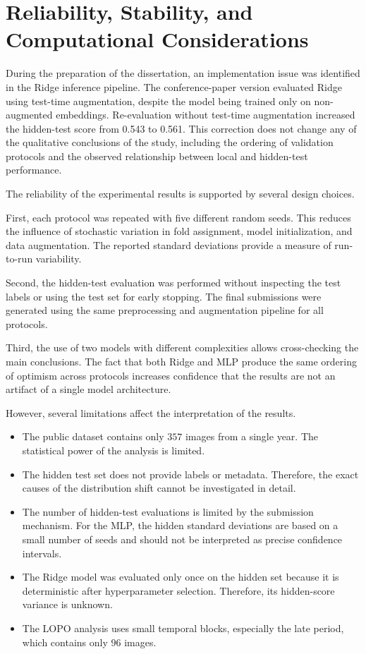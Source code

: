 \section{Reliability, Stability, and Computational Considerations}

During the preparation of the dissertation, an implementation issue was identified in the Ridge inference pipeline. The conference-paper version evaluated Ridge using test-time augmentation, despite the model being trained only on non-augmented embeddings. Re-evaluation without test-time augmentation increased the hidden-test score from 0.543 to 0.561. This correction does not change any of the qualitative conclusions of the study, including the ordering of validation protocols and the observed relationship between local and hidden-test performance.

The reliability of the experimental results is supported by several design choices.

First, each protocol was repeated with five different random seeds. This reduces the influence of stochastic variation in fold assignment, model initialization, and data augmentation. The reported standard deviations provide a measure of run-to-run variability.

Second, the hidden-test evaluation was performed without inspecting the test labels or using the test set for early stopping. The final submissions were generated using the same preprocessing and augmentation pipeline for all protocols.

Third, the use of two models with different complexities allows cross-checking the main conclusions. The fact that both Ridge and MLP produce the same ordering of optimism across protocols increases confidence that the results are not an artifact of a single model architecture.

However, several limitations affect the interpretation of the results.

\begin{itemize}
    \item The public dataset contains only $357$ images from a single year. The statistical power of the analysis is limited.
    \item The hidden test set does not provide labels or metadata. Therefore, the exact causes of the distribution shift cannot be investigated in detail.
    \item The number of hidden-test evaluations is limited by the submission mechanism. For the MLP, the hidden standard deviations are based on a small number of seeds and should not be interpreted as precise confidence intervals.
    \item The Ridge model was evaluated only once on the hidden set because it is deterministic after hyperparameter selection. Therefore, its hidden-score variance is unknown.
    \item The LOPO analysis uses small temporal blocks, especially the late period, which contains only $96$ images.
\end{itemize}

